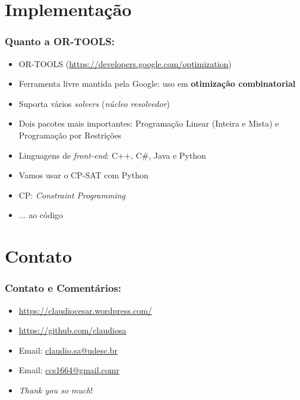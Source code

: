 \documentclass{beamer}
\begin{document}

\section{Implementação}
\begin{frame} 
	\frametitle{Quanto a OR-TOOLS:}
	
	\begin{block}{}
		
		\begin{itemize}
			\item OR-TOOLS  (\url{https://developers.google.com/optimization})
			\item Ferramenta livre mantida pela Google: uso em \textbf{otimização combinatorial}
			\item Suporta vários \textit{solvers} (\textit{núcleo resolvedor})
			\item Dois pacotes mais importantes: Programação Linear (Inteira e Mista)  e Programação por Restrições
			\item Linguagens de \textit{front-end}: C++, C\#, Java e Python
			\item Vamos usar  o CP-SAT com Python
			\item CP: \textit{Constraint Programming}
			\item ... ao código
					
		\end{itemize}
	\end{block}
\end{frame}




\section*{Contato}

\begin{frame}
\frametitle{Contato e Comentários:}
  
\begin{block}{}
  \begin{itemize}
  \item \url{https://claudiocesar.wordpress.com/}
   \item \url{https://github.com/claudiosa}
   \item Email: \url{claudio.sa@udesc.br}
    \item Email: \url{ccs1664@gmail.comr}

  \item \textit{Thank you so much}!

  \end{itemize}
  \end{block}

\end{frame}


\end{document}

